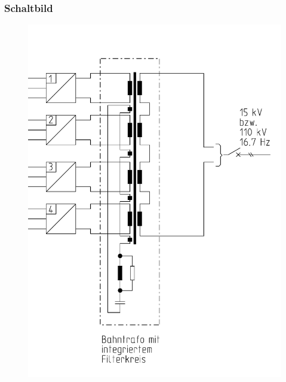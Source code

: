 \subsubsection*{Schaltbild}
\begin{figure}[htb]
\centering
\includegraphics[width=\textwidth/3,frame]{Bilder/stromrichtertrafo.png}
\end{figure}
\clearpage
